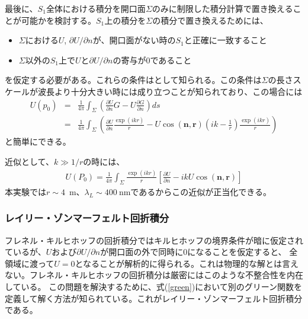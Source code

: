 \documentclass[a4paper,11pt,uplatex]{jsbook}
\begin{document}
最後に、$S_1$全体における積分を開口面$\Sigma$のみに制限した積分計算で置き換えることが可能かを検討する。$S_1$上の積分を$\Sigma$の積分で置き換えるためには、
\begin{itemize}
  \item $\Sigma$における$U$, $\partial U/\partial n$が、開口面がない時の$S_1$と正確に一致すること
  \item $\Sigma$以外の$S_1$上で$U$と$\partial U/\partial n$の寄与が0であること
\end{itemize}
を仮定する必要がある。これらの条件はとして知られる。この条件は$\Sigma$の長さスケールが波長より十分大きい時には成り立つことが知られており、この場合には
\begin{eqnarray}
  U(p_0) &=& \frac{1}{4\pi}\int_\Sigma \left( \frac{\partial U}{\partial n}G - U \frac{\partial G}{\partial n}\right)ds \\
  &=& \frac{1}{4\pi} \int_\Sigma \left( \frac{\partial U}{\partial n}\frac{\exp(ikr)}{r} - U \cos(\bm{n},\bm{r})\left(ik - \frac{1}{r}\right)\frac{\exp(ikr)}{r}\right)
\end{eqnarray}
と簡単にできる。

近似として、$k \gg 1/r$の時には、
\begin{eqnarray}
  U(P_0) = \frac{1}{4\pi}\int_\Sigma \frac{\exp(ikr)}{r}\left[\frac{\partial U}{\partial n} - ik U \cos(\bm{n},\bm{r})\right]
\end{eqnarray}
本実験では$r\sim 4$~m、$\lambda_L \sim 400~$nmであるからこの近似が正当化できる。

\subsubsection{レイリー・ゾンマーフェルト回折積分}
フレネル・キルヒホッフの回折積分ではキルヒホッフの境界条件が暗に仮定されているが、$U$および$\partial U/\partial n$が開口面の外で同時に0になることを仮定すると、
全領域に渡って$U=0$となることが解析的に得られる。これは物理的な解とは言えない。フレネル・キルヒホッフの回折積分は厳密にはこのような不整合性を内在している。
この問題を解決するために、式(\ref{green})において別のグリーン関数を定義して解く方法が知られている。これがレイリー・ゾンマーフェルト回折積分である。
\end{document}

